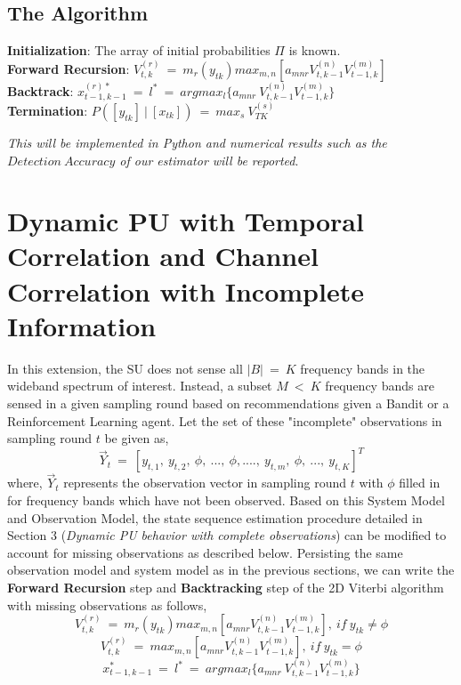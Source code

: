 \documentclass[12pt, draftcls, onecolumn]{IEEEtran}
\begin{document}
\subsection{The Algorithm}
\begin{flushleft}
\textbf{Initialization}: The array of initial probabilities $\Pi$ is known.
\\\textbf{Forward Recursion}: $V_{t,k}^{(r)}\ =\ m_r(y_{tk})max_{m,n}[a_{mnr}V_{t,k-1}^{(n)}V_{t-1,k}^{(m)}]$
\\\textbf{Backtrack}: $x_{t-1,k-1}^{(r)*}\ =\ l^*\ =\ argmax_{l}\{a_{mnr}\ V_{t,k-1}^{(n)}V_{t-1,k}^{(m)}\}$
\\\textbf{Termination}: $P([y_{tk}]\ |\ [x_{tk}])\ =\ max_s\ V_{TK}^{(s)}$
\end{flushleft}
\textit{This will be implemented in Python and numerical results such as the $Detection\ Accuracy$ of our estimator will be reported}.
\section{Dynamic PU with Temporal Correlation and Channel Correlation with Incomplete Information}
In this extension, the SU does not sense all $|B|\ =\ K$ frequency bands in the wideband spectrum of interest. Instead, a subset $M\ <\ K$ frequency bands are sensed in a given sampling round based on recommendations given a Bandit or a Reinforcement Learning agent. Let the set of these "incomplete" observations in sampling round $t$ be given as,
\[\vec{Y}_t\ =\ [y_{t,1},\ y_{t,2},\ \phi,\ ...,\ \phi,....,\ y_{t,m},\ \phi,\ ...,\ y_{t,K}]^T\]
where, $\vec{Y}_t$ represents the observation vector in sampling round $t$ with $\phi$ filled in for frequency bands which have not been observed.
Based on this System Model and Observation Model, the state sequence estimation procedure detailed in Section 3 (\textit{Dynamic PU behavior with complete observations}) can be modified to account for missing observations as described below.
Persisting the same observation model and system model as in the previous sections, we can write the \textbf{Forward Recursion} step and \textbf{Backtracking} step of the 2D Viterbi algorithm with missing observations as follows,
\[V_{t,k}^{(r)}\ =\ m_r(y_{tk})max_{m,n}[a_{mnr}V_{t,k-1}^{(n)}V_{t-1,k}^{(m)}],\ if\ y_{tk}\neq\phi\]
\[V_{t,k}^{(r)}\ =\ max_{m,n}[a_{mnr}V_{t,k-1}^{(n)}V_{t-1,k}^{(m)}],\ if\ y_{tk}=\phi\]
\[x_{t-1,k-1}^*\ =\ l^*\ =\ argmax_{l}\{a_{mnr}\ V_{t,k-1}^{(n)}V_{t-1,k}^{(m)}\}\]
\end{document}

